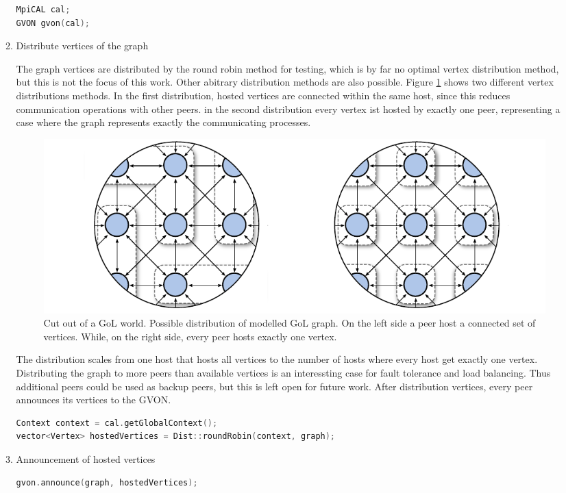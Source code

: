 \begin{enumerate}
\begin{enumerate}
  \begin{lstlisting}[language=C++, label=lst:]
MpiCAL cal;
GVON gvon(cal);
  \end{lstlisting}

\item Distribute vertices of the graph

  The graph vertices are distributed by the round robin method for
  testing, which is by far no optimal vertex distribution method, but
  this is not the focus of this work.  Other abitrary distribution
  methods are also possible. Figure \ref{fig:gol_mapping} shows two
  different vertex distributions methods.  In the first distribution,
  hosted vertices are connected within the same host, since this
  reduces communication operations with other peers.  in the second
  distribution every vertex ist hosted by exactly one peer,
  representing a case where the graph represents exactly the
  communicating processes.

  \begin{figure}[H]
    \centering
    \includegraphics[width=\textwidth]{graphics/40_gol_mapping}
    \caption{Cut out of a GoL world. Possible distribution of modelled
      GoL graph. On the left side a peer host a connected set of
      vertices. While, on the right side, every peer hosts exactly one
      vertex.}
    \label{fig:gol_mapping}
  \end{figure}

  The distribution scales from one host that hosts all vertices to the
  number of hosts where every host get exactly one
  vertex. Distributing the graph to more peers than available vertices
  is an interessting case for fault tolerance and load balancing. Thus
  additional peers could be used as backup peers, but this is left
  open for future work.  After distribution vertices, every peer
  announces its vertices to the GVON.

  \begin{lstlisting}[language=C++, label=lst:]
Context context = cal.getGlobalContext();
vector<Vertex> hostedVertices = Dist::roundRobin(context, graph);

  \end{lstlisting}

\item Announcement of hosted vertices
  \begin{lstlisting}[language=C++, label=lst:]
gvon.announce(graph, hostedVertices);
  \end{lstlisting}
  \end{enumerate}
\end{enumerate}

